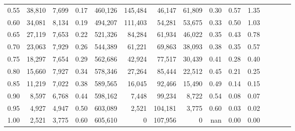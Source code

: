 \begin{tabular}{rrrcrrrrrrrrrrr}
0.55 &  38,810 &  7,699 &                                       0.17 &  460,126 &  145,484 &   46,147 &   61,809 &  0.30 &  0.57 &                         1.35 \\
0.60 &  34,081 &  8,134 &                                       0.19 &  494,207 &  111,403 &   54,281 &   53,675 &  0.33 &  0.50 &                         1.03 \\
0.65 &  27,119 &  7,653 &                                       0.22 &  521,326 &   84,284 &   61,934 &   46,022 &  0.35 &  0.43 &                         0.78 \\
0.70 &  23,063 &  7,929 &                                       0.26 &  544,389 &   61,221 &   69,863 &   38,093 &  0.38 &  0.35 &                         0.57 \\
0.75 &  18,297 &  7,654 &                                       0.29 &  562,686 &   42,924 &   77,517 &   30,439 &  0.41 &  0.28 &                         0.40 \\
0.80 &  15,660 &  7,927 &                                       0.34 &  578,346 &   27,264 &   85,444 &   22,512 &  0.45 &  0.21 &                         0.25 \\
0.85 &  11,219 &  7,022 &                                       0.38 &  589,565 &   16,045 &   92,466 &   15,490 &  0.49 &  0.14 &                         0.15 \\
0.90 &   8,597 &  6,768 &                                       0.44 &  598,162 &    7,448 &   99,234 &    8,722 &  0.54 &  0.08 &                         0.07 \\
0.95 &   4,927 &  4,947 &                                       0.50 &  603,089 &    2,521 &  104,181 &    3,775 &  0.60 &  0.03 &                         0.02 \\
1.00 &   2,521 &  3,775 &                                       0.60 &  605,610 &        0 &  107,956 &        0 &   nan &  0.00 &                         0.00 \\
\bottomrule
\end{tabular}
